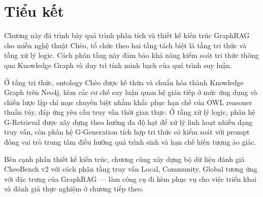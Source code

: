 \section*{Tiểu kết}
Chương này đã trình bày quá trình phân tích và thiết kế kiến trúc GraphRAG cho miền nghệ thuật Chèo, tổ chức theo hai tầng tách biệt là tầng tri thức và tầng xử lý logic. Cách phân tầng này đảm bảo khả năng kiểm soát tri thức thông qua Knowledge Graph và duy trì tính minh bạch của quá trình suy luận.

Ở tầng tri thức, ontology Chèo được kế thừa và chuẩn hóa thành Knowledge Graph trên Neo4j, kèm các cơ chế suy luận quan hệ gián tiếp ở mức ứng dụng và chiến lược lập chỉ mục chuyên biệt nhằm khắc phục hạn chế của OWL reasoner thuần túy, đáp ứng yêu cầu truy vấn thời gian thực. Ở tầng xử lý logic, phân hệ G-Retrieval được xây dựng theo hướng đa độ hạt để xử lý linh hoạt nhiều dạng truy vấn, còn phân hệ G-Generation tích hợp tri thức có kiểm soát với prompt đóng vai trò trung tâm điều hướng quá trình sinh và hạn chế hiện tượng ảo giác.

Bên cạnh phần thiết kế kiến trúc, chương cũng xây dựng bộ dữ liệu đánh giá CheoBench v2 với cách phân tầng truy vấn Local, Community, Global tương ứng với đặc trưng của GraphRAG --- làm công cụ đi kèm phục vụ cho việc triển khai và đánh giá thực nghiệm ở chương tiếp theo.
